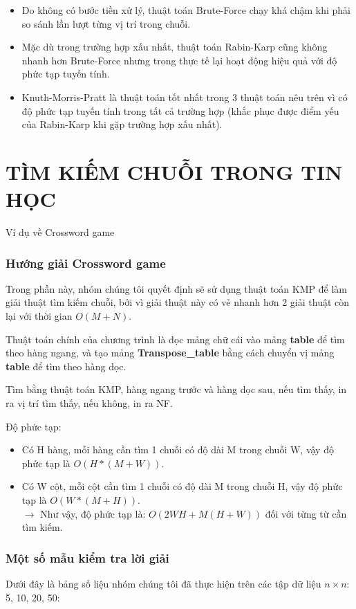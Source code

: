 \documentclass[a4paper,11pt]{article}
\begin{document}
			\begin{itemize}
				\item Do không có bước tiền xử lý, thuật toán Brute-Force chạy khá chậm khi phải so sánh lần lượt từng vị trí trong chuỗi.
				\item Mặc dù trong trường hợp xấu nhất, thuật toán Rabin-Karp cũng không nhanh hơn Brute-Force nhưng trong thực tế lại hoạt động hiệu quả với độ phức tạp tuyến tính.
				\item Knuth-Morris-Pratt là thuật toán tốt nhất trong 3 thuật toán nêu trên vì có độ phức tạp tuyến tính trong tất cả trường hợp (khắc phục được điểm yếu của Rabin-Karp khi gặp trường hợp xấu nhất).
			\end{itemize}
	
	\part{TÌM KIẾM CHUỖI TRONG TIN HỌC}
	\Large {Ví dụ về Crossword game}
	\setcounter{section}{0}
	\section{Hướng giải Crossword game}

	Trong phần này, nhóm chúng tôi quyết định sẽ sử dụng thuật toán KMP để làm giải thuật tìm kiếm chuỗi, bởi vì giải thuật này có vẻ nhanh hơn 2 giải thuật còn lại với thời gian $O(M + N)$.

	Thuật toán chính của chương trình là đọc mảng chữ cái vào mảng \textbf{table} để tìm theo hàng ngang, và tạo mảng \textbf{Transpose\_table} bằng cách chuyển vị mảng \textbf{table} để tìm theo hàng dọc.

	Tìm bằng thuật toán KMP, hàng ngang trước và hàng dọc sau, nếu tìm thấy, in ra vị trí tìm thấy, nếu không, in ra NF.

	Độ phức tạp:
	\begin{itemize}
		\item Có H hàng, mỗi hàng cần tìm 1 chuỗi có độ dài M trong chuỗi W, vậy độ phức tạp là $O(H*(M + W))$.
		\item Có W cột, mỗi cột cần tìm 1 chuỗi có độ dài M trong chuỗi H, vậy độ phức tạp là $O(W*(M + H))$.
		\\$\to$ Như vậy, độ phức tạp là: $O(2WH + M(H + W))$ đối với từng từ cần tìm kiếm.
	\end{itemize}
	\section{Một số mẫu kiểm tra lời giải}
	Dưới đây là bảng số liệu nhóm chúng tôi đã thực hiện trên các tập dữ liệu $n \times n$: 5, 10, 20, 50:
\end{document}
